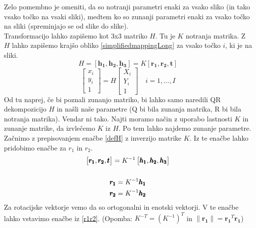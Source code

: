 Zelo pomembno je omeniti, da so notranji parametri enaki za vsako sliko (in tako vsako točko na vsaki sliki), medtem ko so zunanji parametri enaki za vsako točko na sliki (spreminjajo se od slike do slike). \\
Transformacijo lahko zapišemo kot 3x3 matriko $H$. Tu je $K$ notranja matrika. Z $H$ lahko zapišemo krajšo obliko \ref{simplifiedmappingLong} za vsako točko $i$, ki je na sliki.
\begin{equation}
H=[\pmb{h_1}, \pmb{h_2}, \pmb{h_3}]=K[\pmb{r_1}, \pmb{r_2}, \pmb{t}]
\label{defH}
\end{equation}
\begin{equation}
    \begin{bmatrix}
        x_i \\
        y_i \\
        1 
    \end{bmatrix}
    =
    H
    \begin{bmatrix}
        X_i \\
        Y_i \\
        1 
    \end{bmatrix}
    \quad
    i=1,...,I
    \label{simMap}
\end{equation}
Od tu naprej, če bi poznali zunanjo matriko, bi lahko samo naredili QR dekompozicijo $H$ in našli naše parametre (Q bi bila zunanja matrika, R bi bila notranja matrika). Vendar ni tako. Najti moramo način z uporabo lastnosti $K$ in zunanje matrike, da izvlečemo $K$ iz $H$. Po tem lahko najdemo zunanje parametre. \\
Začnimo z prepisovanjem enačbe \ref{defH} z inverzijo matrike $K$. Iz te enačbe lahko pridobimo enačbe za $r_1$ in $r_2$.
\begin{gather}
    \begin{bmatrix}
        \pmb{r_1}, \pmb{r_2}, \pmb{t}
    \end{bmatrix}
    =
    K^{-1}
    \begin{bmatrix}
        \pmb{h_1}, \pmb{h_2}, \pmb{h_3}
    \end{bmatrix}   \notag\\
    \notag\\
    \pmb{r_1}=K^{-1}\pmb{h_1} \notag\\
    \pmb{r_2}=K^{-1}\pmb{h_2}
    \label{r1r2}
\end{gather}
Za rotacijske vektorje vemo da so ortogonalni in enotski vektorji. V te enačbe lahko vstavimo enačbe iz \ref{r1r2}. (Opomba: $K^{-T}=(K^{-1})^T$ in $\|\pmb{r_1}\|=\pmb{r_1}^T \pmb{r_1}$)
